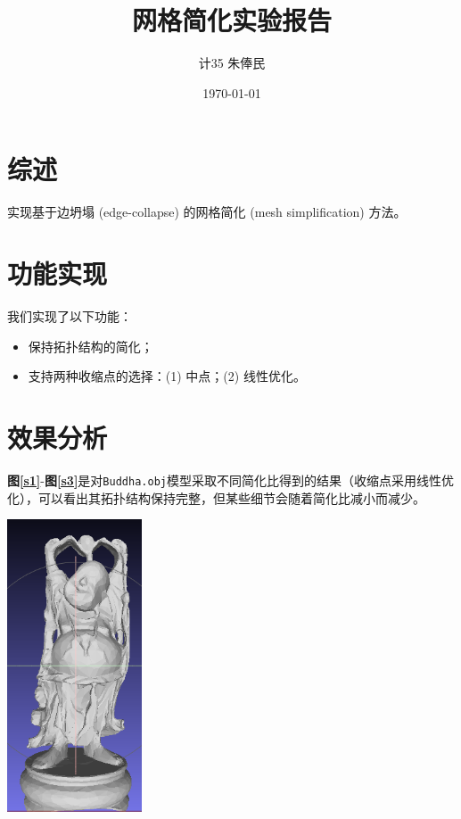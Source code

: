 \documentclass[11pt, a4paper]{article}
\title{\hei 网格简化实验报告}
\author{\kai \quad 计35 \quad 朱俸民 \quad 2012011894}
\date{\kai \today}
\makeatletter
\newcommand\fcaption{\def\@captype{figure}\caption}
\newcommand{\fref}[1]{\textbf{图\ref{#1}}}
\makeatother
\begin{document}
\maketitle

\section{综述}

实现基于边坍塌 (edge-collapse) 的网格简化 (mesh simplification) 方法。

\section{功能实现}

我们实现了以下功能：

\begin{itemize}
    \item 保持拓扑结构的简化；
    \item 支持两种收缩点的选择：(1) 中点；(2) 线性优化。
\end{itemize}

\section{效果分析}

\fref{s1}-\fref{s3}是对\texttt{Buddha.obj}模型采取不同简化比得到的结果（收缩点采用线性优化），可以看出其拓扑结构保持完整，但某些细节会随着简化比减小而减少。

\begin{center}
    \includegraphics[width=4cm]{../output/buddha0.1.png}
    \fcaption{简化比0.1}\label{s1}
\end{center}
\end{document}
